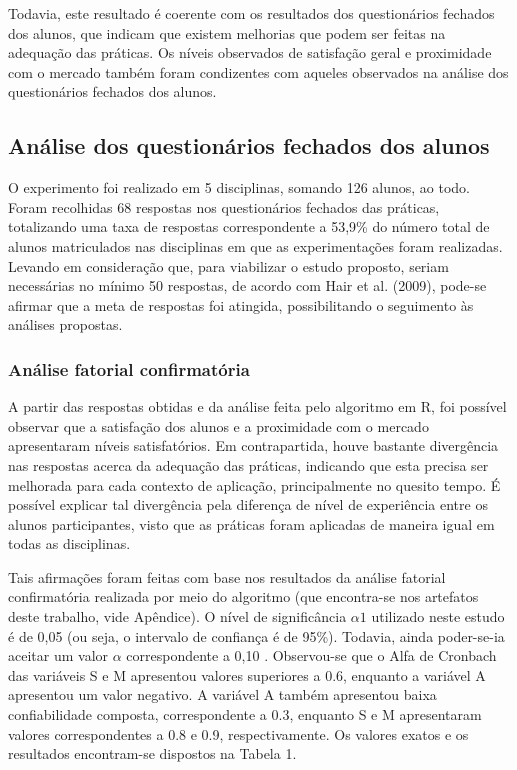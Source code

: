 Todavia, este resultado é coerente com os resultados dos questionários fechados dos alunos, que indicam que existem melhorias que podem ser feitas na adequação das práticas. Os níveis observados de satisfação geral e proximidade com o mercado também foram condizentes com aqueles observados na análise dos questionários fechados dos alunos.

\subsection{Análise dos questionários fechados dos alunos}

O experimento foi realizado em 5 disciplinas, somando 126 alunos, ao todo. Foram recolhidas 68 respostas nos questionários fechados das práticas, totalizando uma taxa de respostas correspondente a 53,9\% do número total de alunos matriculados nas disciplinas em que as experimentações foram realizadas. Levando em consideração que, para viabilizar o estudo proposto, seriam necessárias no mínimo 50 respostas, de acordo com Hair et al. (2009)\nocite{hair2009analise}, pode-se afirmar que a meta de respostas foi atingida, possibilitando o seguimento às análises propostas.

\subsubsection{Análise fatorial confirmatória}

A partir das respostas obtidas e da análise feita pelo algoritmo em R, foi possível observar que a satisfação dos alunos e a proximidade com o mercado apresentaram níveis satisfatórios. Em contrapartida, houve bastante divergência nas respostas acerca da adequação das práticas, indicando que esta precisa ser melhorada para cada contexto de aplicação, principalmente no quesito tempo. É possível explicar tal divergência pela diferença de nível de experiência entre os alunos participantes, visto que as práticas foram aplicadas de maneira igual em todas as disciplinas.

Tais afirmações foram feitas com base nos resultados da análise fatorial confirmatória realizada por meio do algoritmo (que encontra-se nos artefatos deste trabalho, vide Apêndice). O nível de significância $\alpha1$ utilizado neste estudo é de 0,05 (ou seja, o intervalo de confiança é de 95\%). Todavia, ainda poder-se-ia aceitar um valor $\alpha$ correspondente a 0,10 \cite{hair2009analise}. Observou-se que o Alfa de Cronbach das variáveis S e M apresentou valores superiores a 0.6, enquanto a variável A apresentou um valor negativo. A variável A também apresentou baixa confiabilidade composta, correspondente a 0.3, enquanto S e M apresentaram valores correspondentes a 0.8 e 0.9, respectivamente. Os valores exatos e os resultados encontram-se dispostos na Tabela 1. 

